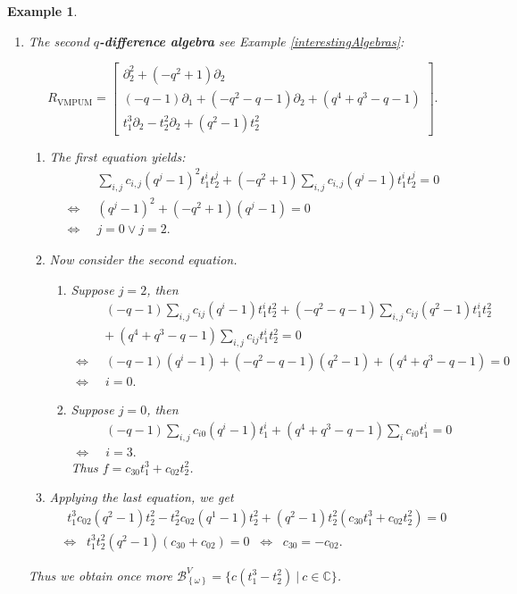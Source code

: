 \documentclass[a4paper,10pt]{article}
\newtheorem{ex}[Th]{Example}
\theoremstyle{nonumberplain}
\newcommand{\C}{\mathbb{C}}
\DeclareMathOperator{\VMPUM}{VMPUM}
\begin{document}
\begin{ex}
\begin{enumerate}
 \item  The second \textbf{$q$-difference algebra} see Example \ref{interestingAlgebras}:
\begin{small} $$
R_{\VMPUM} = \left[ \begin{array}{c}
\partial_2^2+(-q^2+1) \partial_2\\
(-q-1) \partial_1+(-q^2-q-1) \partial_2+(q^4+q^3-q-1)\\
t_1^3 \partial_2-t_2^2 \partial_2+(q^2-1) t_2^2
\end{array}\right]. $$ \end{small}
\begin{enumerate}
\item The first equation yields:
\begin{align*}
&\;\; \sum_{i,j}c_{i,j}(q^j-1)^2t_1^it_2^j + (-q^2+1) \sum_{i,j}c_{i,j}(q^j-1)t_1^it_2^j = 0 \\
\Leftrightarrow & \;\;(q^j-1)^2+(-q^2+1)(q^j-1)=0 \\
\Leftrightarrow & \;\; j=0 \vee j=2.
\end{align*}
\item Now consider the second equation. 
\begin{enumerate}
\item Suppose $j=2$, then
\begin{align*}
& \;\;(-q-1)\sum_{i,j}c_{ij}(q^i-1)t_1^it_2^2  +(-q^2-q-1) \sum_{i,j}c_{ij}(q^2-1)t_1^it_2^2\\
& \;+(q^4+q^3-q-1)\sum_{i,j}c_{ij}t_1^it_2^2=0\\
\Leftrightarrow & \;\; (-q-1)(q^i-1)+(-q^2-q-1)(q^2-1)+(q^4+q^3-q-1)=0 \\
\Leftrightarrow & \;\; i=0.
\end{align*}
\item Suppose $j=0$, then
\begin{align*}
& \;\;(-q-1)\sum_{i,j}c_{i0}(q^i-1)t_1^i +(q^4+q^3-q-1)\sum_{i}c_{i0}t_1^i=0 \\
\Leftrightarrow & \;\; i=3.
\end{align*}
Thus \quad $f = c_{30} t_1^3 + c_{02}t_2^2$.
\end{enumerate}
\item Applying the last equation, we get 
\begin{align*}
\;\;t_1^3 c_{02}(q^2-1)t_2^2 -t_2^2 c_{02}(q^1-1)t_2^2 +(q^2-1) t_2^2 ( c_{30} t_1^3 + c_{02}t_2^2 ) =0\\
\Leftrightarrow \;\; t_1^3t_2^2(q^2-1)( c_{30} + c_{02} ) = 0 \;\; \Leftrightarrow \;\; c_{30} =-c_{02}.
\end{align*}
\end{enumerate}
Thus we obtain once more $\mathcal{B}_{\left\lbrace \omega \right\rbrace }^V= \{ c (t_1^3 -t_2^2) \ | \ c\in \C \}$.
\end{enumerate}
\end{ex}
\end{document}
